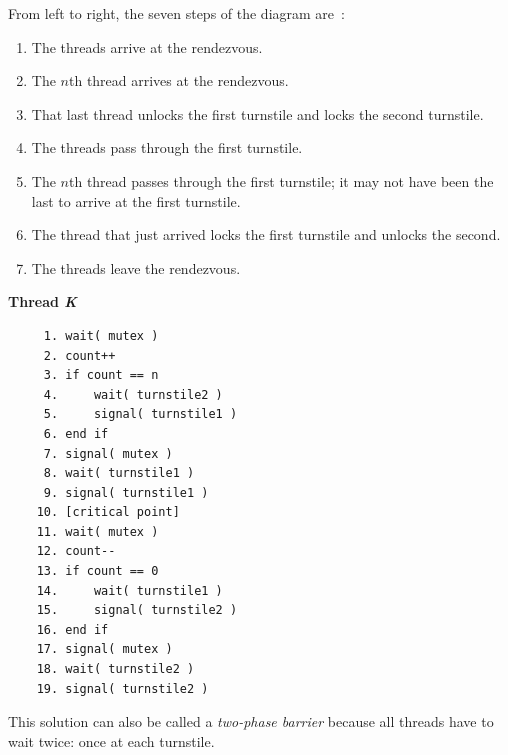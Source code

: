 From left to right, the seven steps of the diagram are~\cite{mte241}:
\begin{enumerate}
	\item The threads arrive at the rendezvous.
	\item The $n$th thread arrives at the rendezvous.
	\item That last thread unlocks the first turnstile and locks the second turnstile.
	\item The threads pass through the first turnstile.
	\item The $n$th thread passes through the first turnstile; it may not have been the last to arrive at the first turnstile.
	\item The thread that just arrived locks the first turnstile and unlocks the second.
	\item The threads leave the rendezvous.
\end{enumerate}

\textbf{Thread \textit{K}}\vspace{-2em}
  \begin{verbatim}
	 1. wait( mutex )
	 2. count++
	 3. if count == n
	 4.     wait( turnstile2 )
	 5.     signal( turnstile1 )
	 6. end if
	 7. signal( mutex )
	 8. wait( turnstile1 )
	 9. signal( turnstile1 )
	10. [critical point]
	11. wait( mutex )
	12. count--
	13. if count == 0
	14.     wait( turnstile1 )
	15.     signal( turnstile2 )
	16. end if
	17. signal( mutex )
	18. wait( turnstile2 )
	19. signal( turnstile2 )
  \end{verbatim}
\vspace{-2em}

This solution can also be called a \textit{two-phase barrier} because all threads have to wait twice: once at each turnstile.





